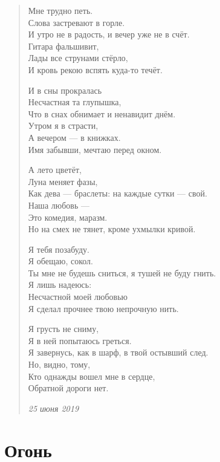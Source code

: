 \begin{verse}
Мне трудно петь.\\
Слова застревают в горле.\\
И утро не в радость, и вечер уже не в счёт.\\
Гитара фальшивит,\\
Лады все струнами стёрло,\\
И кровь рекою вспять куда-то течёт.

И в сны прокралась\\
Несчастная та глупышка,\\
Что в снах обнимает и ненавидит днём.\\
Утром я в страсти,\\
А вечером --- в книжках.\\
Имя забывши, мечтаю перед окном.

А лето цветёт,\\
Луна меняет фазы,\\
Как дева --- браслеты: на каждые сутки --- свой.\\
Наша любовь ---\\
Это комедия, маразм.\\
Но на смех не тянет, кроме ухмылки кривой.

Я тебя позабуду.\\
Я обещаю, сокол.\\
Ты мне не будешь сниться, я тушей не буду гнить.\\
Я лишь надеюсь:\\
Несчастной моей любовью\\
Я сделал прочнее твою непрочную нить.

Я грусть не сниму,\\
Я в ней попытаюсь греться.\\
Я завернусь, как в шарф, в твой остывший след.\\
Но, видно, тому,\\
Кто однажды вошел мне в сердце,\\
Обратной дороги нет.

\emph{25 июня 2019}
\end{verse}
\newpage

\section{Огонь}

